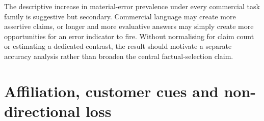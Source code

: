 \documentclass[12pt,a4paper,oneside]{report}
\newcommand{\rev}[1]{#1}
\newenvironment{revisionblock}{}{}
\begin{document}
\begin{revisionblock}
The descriptive increase in material-error prevalence under every commercial task family is suggestive but secondary. Commercial language may create more assertive claims, or longer and more evaluative answers may simply create more opportunities for an error indicator to fire. Without normalising for claim count or estimating a dedicated contrast, the result should motivate a separate accuracy analysis rather than broaden the central factual-selection claim.
\end{revisionblock}

\section[Affiliation, customer cues and non-directional loss]{\rev{Affiliation, customer cues and non-directional loss}}
\end{document}
